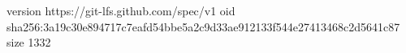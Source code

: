 version https://git-lfs.github.com/spec/v1
oid sha256:3a19c30e894717c7eafd54bbe5a2c9d33ae912133f544e27413468c2d5641c87
size 1332

